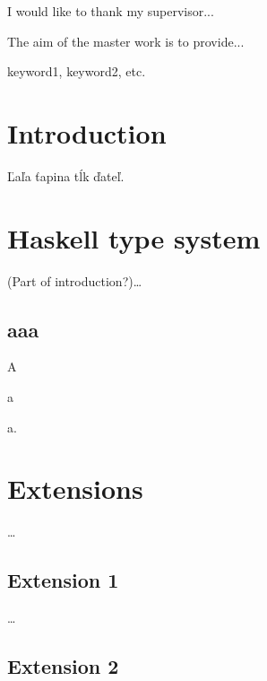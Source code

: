 \documentclass[11pt,oneside,draft]{fithesis2}
\begin{document}
\FrontMatter
\ThesisTitlePage

\begin{ThesisDeclaration}
\DeclarationText
\AdvisorName
\end{ThesisDeclaration}

\begin{ThesisThanks}
I would like to thank my supervisor...
\end{ThesisThanks}

\begin{ThesisAbstract}
The aim of the master work is to provide...
\end{ThesisAbstract}

\begin{ThesisKeyWords}
keyword1, keyword2, etc.
\end{ThesisKeyWords}

\tableofcontents

\MainMatter

\chapter{Introduction}
Ľaľa ťapina tĺk ďateľ.

\chapter{Haskell type system}

(Part of introduction?)\dots

\section{aaa}

A

a

a.

\chapter{Extensions}

\dots

\section{Extension 1}

\dots

\section{Extension 2}
\end{document}
